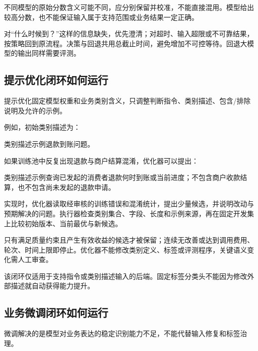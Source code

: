 \documentclass[UTF8,a4paper,11pt,fontset=windows]{ctexart}
\begin{document}
不同模型的原始分数含义可能不同，应分别保留并校准，不能直接混用。模型给出较高分数，也不能保证输入属于支持范围或业务结果一定正确。


对“什么时候到？”这样的信息缺失，优先澄清；对超时、输入超限或不可靠结果，按策略回到原流程。决策与回退共用总截止时间，避免增加不可控等待。回退大模型的输出同样需要评测。


\subsection{提示优化闭环如何运行}

提示优化固定模型权重和业务类别含义，只调整判断指令、类别描述、包含/排除说明及允许的示例。


例如，初始类别描述为：


\begin{insight}{类别描述示例}退款到账问题。\end{insight}

如果训练池中反复出现退款与商户结算混淆，优化器可以提出：


\begin{insight}{类别描述示例}查询已发起的消费者退款何时到账或当前进度；不包含商户收款结算，也不包含尚未发起的退款申请。\end{insight}

实现时，优化器读取经审核的训练错误和混淆统计，提出少量候选，并说明改动与预期解决的问题。执行器检查类别集合、字段、长度和示例来源，再在固定开发集上比较初始版本、当前最优与新候选。


只有满足质量约束且产生有效收益的候选才被保留；连续无改善或达到调用费用、轮次、时间上限即停止。优化器不能修改类别定义、标签或评测程序，关键语义变化需人工审查。


该闭环仅适用于支持指令或类别描述输入的后端。固定标签分类头不能因为修改外部描述就自动获得能力提升。


\subsection{业务微调闭环如何运行}

微调解决的是模型对业务表达的稳定识别能力不足，不能代替输入修复和标签治理。
\end{document}
